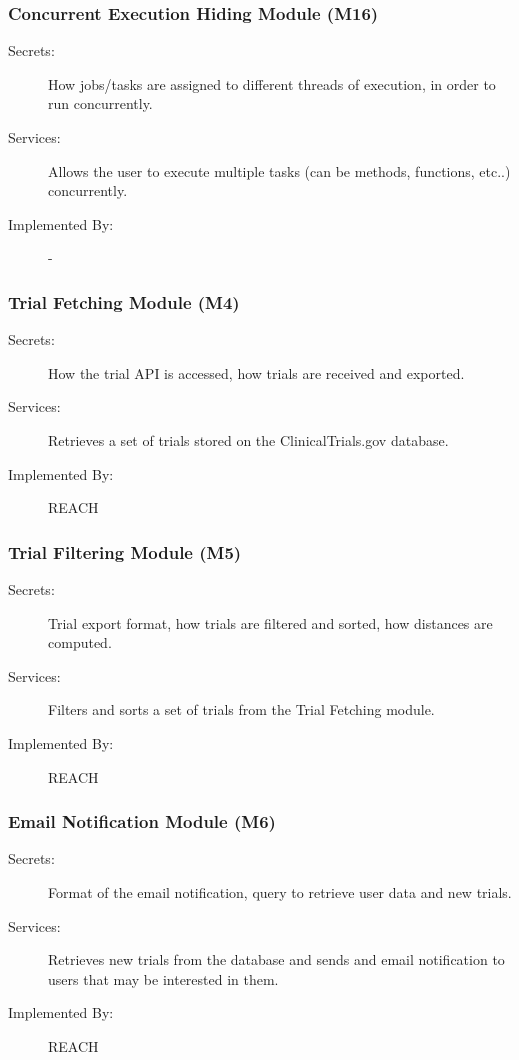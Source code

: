 \documentclass[12pt, titlepage]{article}
\begin{document}
\subsubsection{Concurrent Execution Hiding Module (M16)}
\begin{description}
  \item[Secrets:] How jobs/tasks are assigned to different threads of execution, in order to run concurrently.
  \item[Services:] Allows the user to execute multiple tasks (can be methods, functions, etc..) concurrently.
  \item[Implemented By:] - \\
\end{description}

\subsubsection{Trial Fetching Module (M4)}
\begin{description}
  \item[Secrets:] How the trial API is accessed, how trials are received and exported.
  \item[Services:] Retrieves a set of trials stored on the ClinicalTrials.gov database.
  \item[Implemented By:] REACH \\
\end{description}

\subsubsection{Trial Filtering Module (M5)}
\begin{description}
  \item[Secrets:] Trial export format, how trials are filtered and sorted, how distances are computed.
  \item[Services:] Filters and sorts a set of trials from the Trial Fetching module.
  \item[Implemented By:] REACH \\
\end{description}

\subsubsection{Email Notification Module (M6)}
\begin{description}
  \item[Secrets:] Format of the email notification, query to retrieve user data and new trials.
  \item[Services:] Retrieves new trials from the database and sends and email notification to users that may be interested in them.
  \item[Implemented By:] REACH  \\
\end{description}
\end{document}
